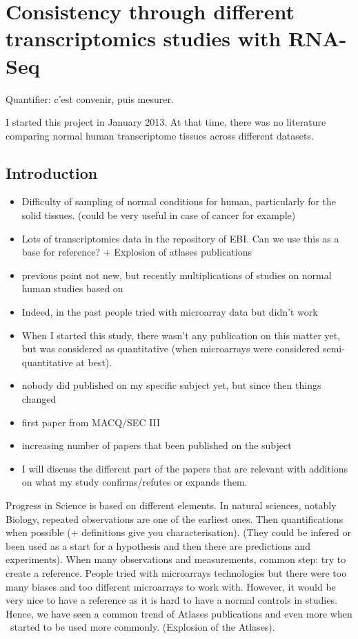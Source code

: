 \chapter{Consistency through different transcriptomics studies with RNA-Seq}
\label{ch:Transcriptomics}
\setlength{\epigraphwidth}{0.45\textwidth}
\setlength{\epigraphrule}{0.1pt}
\epigraph{Quantifier: c'est convenir, puis mesurer.}{\cite{Desrosieres}}


I started this project in January 2013. At that time, there was no
literature comparing normal human transcriptome tissues across different datasets.

\section{Introduction}

\begin{itemize}
    \item Difficulty of sampling of normal conditions for human, particularly
        for the solid tissues. (could be very useful in case of cancer for
        example)
    \item Lots of transcriptomics data in the repository of EBI. Can we use
        this as a base for reference? + Explosion of atlases publications
    \item previous point not new, but recently multiplications of studies on
        normal human studies based on \Rnaseq
    \item Indeed, in the past people tried with microarray data but didn't work
    \item When I started this study, there wasn't any publication on this matter
        yet, but \Rnaseq was considered as quantitative (when microarrays were
        considered semi-quantitative at best).
    \item nobody did published on my specific subject yet, but since then things changed
    \item first paper from MACQ/SEC III
    \item increasing number of papers that been published on the subject
    \item I will discuss the different part of the papers that are relevant
        with additions on what my study confirms/refutes or expands them.
\end{itemize}

Progress in Science is based on different elements. In natural sciences, notably
Biology, repeated observations are one of the earliest ones. Then quantifications
when possible (+ definitions give you characterisation). (They could be infered or
been used as a start for a hypothesis and then there are predictions and
experiments). When many observations and measurements, common step: try to create
a reference. People tried with microarrays technologies but there were too many
biases and too different microarrays to work with. However, it would be very nice
to have a reference as it is hard to have a normal controls in studies. Hence, we
have seen a common trend of Atlases publications and even more when \Rnaseq\ started
to be used more commonly. (Explosion of the Atlases).

